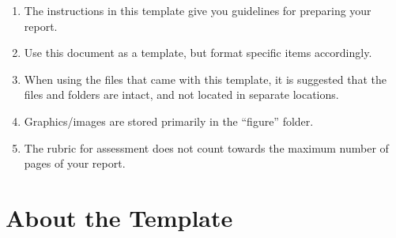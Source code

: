 \begin{enumerate}
	\item The instructions in this template give you guidelines for preparing your report.

	\item Use this document as a template, but format specific items accordingly.
	
	\item When using the files that came with this template, it is suggested that the files and folders are intact, and not located in separate locations.  
	
	\item Graphics/images are stored primarily in the ``figure'' folder. 
	
	\item The rubric for assessment does not count towards the maximum number of pages of your report.
\end{enumerate}




\section{About the Template}

